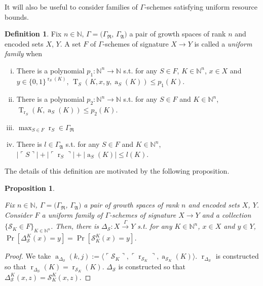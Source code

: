 \documentclass{article}
\numberwithin{equation}{section}
\theoremstyle{definition}
\newtheorem{definition}{Definition}[section]
\theoremstyle{plain}
\newtheorem{proposition}{Proposition}[section]
\newcommand{\WordsLen}[1]{{\{ 0, 1 \}^{#1}}}
\DeclareMathOperator{\T}{T}
\DeclareMathOperator{\R}{r}
\DeclareMathOperator{\A}{a}
\newcommand{\Nats}{\mathbb{N}}
\newcommand{\Abs}[1]{\lvert #1 \rvert}
\newcommand{\Chev}[1]{\langle #1 \rangle}
\newcommand{\Quote}[1]{\ulcorner #1 \urcorner}
\begin{document}
It will also be useful to consider families of $\Gamma$-schemes satisfying uniform resource bounds.

\begin{definition}

Fix $n \in \Nats$, $\Gamma=(\Gamma_{\mathfrak{R}}$, $\Gamma_{\mathfrak{A}})$ a pair of growth spaces of rank $n$ and encoded sets $X$, $Y$. A set $F$ of $\Gamma$-schemes of signature $X \rightarrow Y$ is called a \emph{uniform family} when

\begin{enumerate}[(i)]

\item There is a polynomial $p_1: \Nats^n \rightarrow \Nats$ s.t. for any $S \in F$, $K \in \Nats^n$, $x \in X$ and $y \in \WordsLen{\R_S(K)}$, $\T_S(K,x,y,\A_S(K)) \leq p_1(K)$.

\item There is a polynomial $p_2: \Nats^n \rightarrow \Nats$ s.t. for any $S \in F$ and $K \in \Nats^n$, $\T_{\R_S}(K,\A_S(K)) \leq p_2(K)$.

\item $\max_{S \in F} \R_S \in \Gamma_{\mathfrak{R}}$

\item There is $l \in \Gamma_{\mathfrak{A}}$ s.t. for any $S \in F$ and $K \in \Nats^n$, ${\Abs{\Quote{S}} + \Abs{\Quote{\R_S}} + \Abs{\A_S(K)} \leq l(K)}$.

\end{enumerate}

\end{definition}

The details of this definition are motivated by the following proposition.

\begin{proposition}
\label{prp:fam_diag}

Fix $n \in \Nats$, $\Gamma=(\Gamma_{\mathfrak{R}}$, $\Gamma_{\mathfrak{A}})$ a pair of growth spaces of rank $n$ and encoded sets $X$, $Y$. Consider $F$ a uniform family of $\Gamma$-schemes of signature $X \rightarrow Y$ and a collection $\{\mathcal{S}_K \in F\}_{K \in \Nats^n}$. Then, there is $\Delta_\mathcal{S}: X \xrightarrow{
\Gamma} Y$ s.t. for any $K \in \Nats^n$, $x \in X$ and $y \in Y$, $\Pr[\Delta_\mathcal{S}^K(x)=y] = \Pr[\mathcal{S}_K^K(x)=y]$.

\end{proposition}

\begin{proof}

We take $\A_{\Delta_{\mathcal{S}}}(k,j):=\Chev{\Quote{\mathcal{S}_K},\Quote{\R_{\mathcal{S}_K}},\A_{\mathcal{S}_K}(K)}$. $\R_{\Delta_{\mathcal{S}}}$ is constructed so that $\R_{\Delta_{\mathcal{S}}}(K)=\R_{\mathcal{S}_K}(K)$. $\Delta_{\mathcal{S}}$ is constructed so that $\Delta_{\mathcal{S}}^K(x,z)=\mathcal{S}_K^K(x,z)$.

\end{proof}
\end{document}

